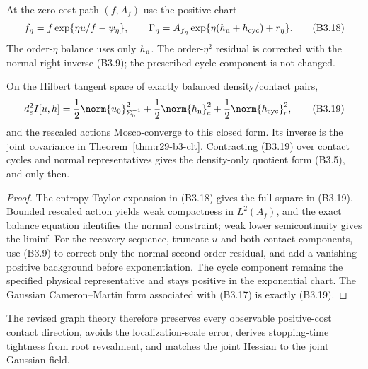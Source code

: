 At the zero-cost path $(f,A_f)$ use the positive chart
\[
 f_\eta=f\exp\{\eta u/f-\psi_\eta\},\qquad
 \Gamma_\eta=A_{f_\eta}
 \exp\{\eta(h_{\rm n}+h_{\rm cyc})+r_\eta\}.              \tag{B3.18}
\]
The order-$\eta$ balance uses only $h_{\rm n}$.  The order-$\eta^2$ residual
is corrected with the normal right inverse (B3.9); the prescribed cycle
component is not changed.

\begin{theorem}
\label{thm:r29-b3-mosco}
On the Hilbert tangent space of exactly balanced density/contact pairs,
\[
 d_e^2I[u,h]
 ={1\over2}\norm{u_0}_{\Sigma_0^{-1}}^2
  +{1\over2}\norm{h_{\rm n}}_c^2
  +{1\over2}\norm{h_{\rm cyc}}_c^2,                      \tag{B3.19}
\]
and the rescaled actions Mosco-converge to this closed form.  Its inverse is
the joint covariance in Theorem~\ref{thm:r29-b3-clt}.  Contracting (B3.19)
over contact cycles and normal representatives gives the density-only
quotient form (B3.5), and only then.
\end{theorem}

\begin{proof}
The entropy Taylor expansion in (B3.18) gives the full square in (B3.19).
Bounded rescaled action yields weak compactness in $L^2(A_f)$, and the exact
balance equation identifies the normal constraint; weak lower
semicontinuity gives the liminf.  For the recovery sequence, truncate $u$ and
both contact components, use (B3.9) to correct only the normal second-order
residual, and add a vanishing positive background before exponentiation.
The cycle component remains the specified physical representative and stays
positive in the exponential chart.  The Gaussian Cameron--Martin form
associated with (B3.17) is exactly (B3.19).
\end{proof}

The revised graph theory therefore preserves every observable positive-cost
contact direction, avoids the localization-scale error, derives stopping-time
tightness from root revealment, and matches the joint Hessian to the joint
Gaussian field.
